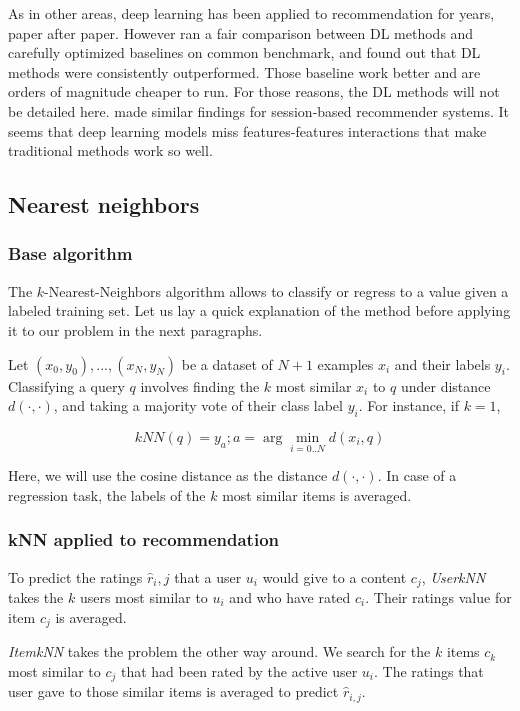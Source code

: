 As in other areas, deep learning has been applied to recommendation for years, paper after paper. However \citet{dlinrec} ran a fair comparison between DL methods and carefully optimized baselines on common benchmark, and found out that DL methods were consistently outperformed. Those baseline work better and are orders of magnitude cheaper to run. For those reasons, the DL methods will not be detailed here. \citet{dlinrecseq} made similar findings for session-based recommender systems. It seems that deep learning models miss features-features interactions that make traditional methods work so well.

\subsection{Nearest neighbors}

\subsubsection{Base algorithm}

The $k$-Nearest-Neighbors algorithm allows to classify or regress to a value given a labeled training set. Let us lay a quick explanation of the method before applying it to our problem in the next paragraphs.

Let ${(x_0, y_0), ..., (x_N, y_N)}$ be a dataset of $N+1$ examples $x_i$ and their labels $y_i$. Classifying a query $q$ involves finding the $k$ most similar $x_i$ to $q$ under distance $d(\cdot, \cdot)$, and taking a majority vote of their class label $y_i$. For instance, if $k=1$,

$$kNN(q) = y_a; a = \arg \min_{i=0..N} d(x_i, q)$$

Here, we will use the cosine distance as the distance $d(\cdot, \cdot)$. In case of a regression task, the labels of the $k$ most similar items is averaged.


\subsubsection{kNN applied to recommendation}

To predict the ratings $\hat{r}_i,j$ that a user $u_i$ would give to a content $c_j$, \emph{UserkNN} takes the $k$ users most similar to $u_i$ and who have rated $c_i$. Their ratings value for item $c_j$ is averaged.


\emph{ItemkNN} takes the problem the other way around. We search for the $k$ items $c_k$ most similar to $c_j$ that had been rated by the active user $u_i$. The ratings that user gave to those similar items is averaged to predict $\hat{r}_{i,j}$.

